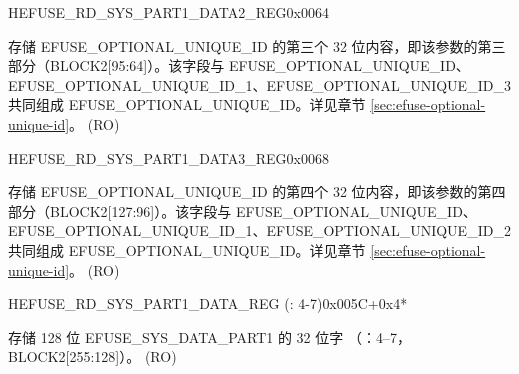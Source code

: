 \begin{register}{H}{EFUSE\_RD\_SYS\_PART1\_DATA2\_REG}{0x0064}\label{regdesc:EFUSERDSYSPART1DATA2REG}
%
\regnewline%
\begin{regdesc}\begin{reglist}
\label{fielddesc:EFUSEOPTIONALUNIQUEID2}\item [EFUSE\_OPTIONAL\_UNIQUE\_ID\_2] 存储 EFUSE\_OPTIONAL\_UNIQUE\_ID 的第三个 32 位内容，即该参数的第三部分（BLOCK2[95:64]）。该字段与 EFUSE\_OPTIONAL\_UNIQUE\_ID、EFUSE\_OPTIONAL\_UNIQUE\_ID\_1、EFUSE\_OPTIONAL\_UNIQUE\_ID\_3 共同组成 EFUSE\_OPTIONAL\_UNIQUE\_ID。详见章节 \ref{sec:efuse-optional-unique-id}。 (RO)
\end{reglist}\end{regdesc}
\end{register}


\begin{register}{H}{EFUSE\_RD\_SYS\_PART1\_DATA3\_REG}{0x0068}\label{regdesc:EFUSERDSYSPART1DATA3REG}
%
\regnewline%
\begin{regdesc}\begin{reglist}
\label{fielddesc:EFUSEOPTIONALUNIQUEID3}\item [EFUSE\_OPTIONAL\_UNIQUE\_ID\_3] 存储 EFUSE\_OPTIONAL\_UNIQUE\_ID 的第四个 32 位内容，即该参数的第四部分（BLOCK2[127:96]）。该字段与 EFUSE\_OPTIONAL\_UNIQUE\_ID、EFUSE\_OPTIONAL\_UNIQUE\_ID\_1、EFUSE\_OPTIONAL\_UNIQUE\_ID\_2 共同组成 EFUSE\_OPTIONAL\_UNIQUE\_ID。详见章节 \ref{sec:efuse-optional-unique-id}。 (RO)
\end{reglist}\end{regdesc}
\end{register}


\begin{register}{H}{EFUSE\_RD\_SYS\_PART1\_DATA\_REG (: 4-7)}{0x005C+0x4*}\label{regdesc:EFUSERDSYSPART1DATA4TO7REG}
%
\regnewline%
\begin{regdesc}\begin{reglist}
\label{fielddesc:EFUSESYSDATAPART1N}\item [EFUSE\_SYS\_DATA\_PART1\_\regindex{n}] 存储 128 位 EFUSE\_SYS\_DATA\_PART1 的 32 位字 （：4–7，BLOCK2[255:128]）。 (RO)
\end{reglist}\end{regdesc}
\end{register}


